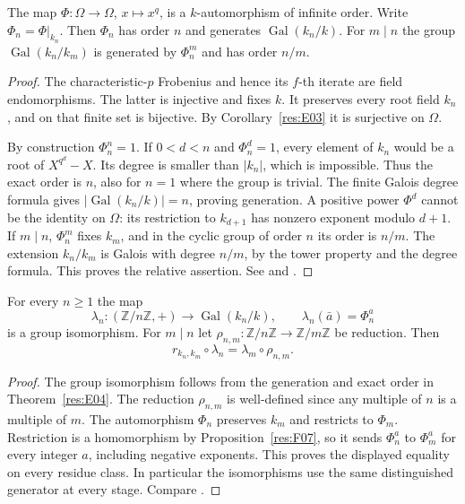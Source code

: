 \begin{theorem}\label{res:E04}
The map \(\Phi:\Omega\to\Omega\), \(x\mapsto x^q\), is a
\(k\)-automorphism of infinite order. Write
\(\Phi_n=\Phi|_{k_n}\). Then \(\Phi_n\) has order \(n\) and
generates \(\operatorname{Gal}(k_n/k)\). For \(m\mid n\) the
group \(\operatorname{Gal}(k_n/k_m)\) is generated by
\(\Phi_n^m\) and has order \(n/m\).
\end{theorem}
\begin{proof}
The characteristic-\(p\) Frobenius and hence its \(f\)-th iterate
are field endomorphisms. The latter is injective and fixes \(k\).
It preserves every root field \(k_n\), and on that finite set is
bijective. By Corollary~\ref{res:E03} it is surjective on \(\Omega\).

By construction \(\Phi_n^n=1\). If \(0<d<n\) and
\(\Phi_n^d=1\), every element of \(k_n\) would be a root of
\(X^{q^d}-X\). Its degree is smaller than \(|k_n|\), which is
impossible. Thus the exact order is \(n\), also for \(n=1\)
where the group is trivial. The finite Galois degree formula
gives \(|\operatorname{Gal}(k_n/k)|=n\), proving generation.
A positive power \(\Phi^d\) cannot be the identity on \(\Omega\):
its restriction to \(k_{d+1}\) has nonzero exponent modulo
\(d+1\). If \(m\mid n\), \(\Phi_n^m\) fixes \(k_m\), and in
the cyclic group of order \(n\) its order is \(n/m\). The
extension \(k_n/k_m\) is Galois with degree \(n/m\), by the
tower property and the degree formula. This proves the relative
assertion. See \cite[Proposition 4.20 and Example 7.17]{milne}
and \cite[Theorem 2.21]{ln}.
\end{proof}

\begin{proposition}\label{res:E05}
For every \(n\geq1\) the map
\[
     \lambda_n:(\mathbb Z/n\mathbb Z,+)
             \longrightarrow \operatorname{Gal}(k_n/k),
     \qquad \lambda_n(\bar a)=\Phi_n^a
\]
is a group isomorphism. For \(m\mid n\) let
\(\rho_{n,m}:\mathbb Z/n\mathbb Z\to\mathbb Z/m\mathbb Z\)
be reduction. Then
\[
          r_{k_n,k_m}\circ\lambda_n=\lambda_m\circ\rho_{n,m}.
\]
\end{proposition}
\begin{proof}
The group isomorphism follows from the generation and exact order
in Theorem~\ref{res:E04}. The reduction \(\rho_{n,m}\) is well-defined
since any multiple of \(n\) is a multiple of \(m\).
The automorphism \(\Phi_n\) preserves \(k_m\) and restricts to
\(\Phi_m\). Restriction is a homomorphism by Proposition~\ref{res:F07},
so it sends
\(\Phi_n^a\) to \(\Phi_m^a\) for every integer \(a\), including
negative exponents. This proves the displayed equality on every
residue class. In particular the isomorphisms use the same
distinguished generator at every stage. Compare
\cite[Examples 7.17 and 7.26]{milne}.
\end{proof}

